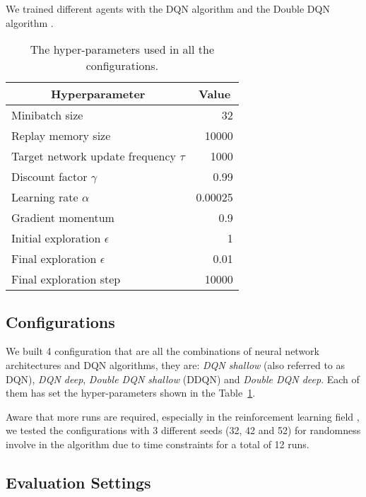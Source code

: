 We trained different agents with the DQN algorithm \cite{Mnih2015} and the Double DQN algorithm \cite{Hasselt:2016:DRL:3016100.3016191}.

\begin{table}
	\centering
	\begin{tabular}{|l|r|}
		\hline
		\multicolumn{1}{|c|}{\textbf{Hyperparameter}} &
		\multicolumn{1}{|c|}{\textbf{Value}}        \\
		\hline
		Minibatch size & 32 \\
		Replay memory size & 10000 \\
		Target network update frequency $\tau$ & 1000 \\
		Discount factor $\gamma$ & 0.99 \\
		Learning rate $\alpha$ & 0.00025 \\
		Gradient momentum & 0.9 \\
		Initial exploration $\epsilon$ & 1 \\
		Final exploration $\epsilon$ & 0.01 \\
		Final exploration step & 10000 \\
		\hline
	\end{tabular}
	
	\caption{The hyper-parameters used in all the configurations.}
	\label{tab:my-hyperparams}
\end{table}

\subsection{Configurations}

We built 4 configuration that are all the combinations of neural network architectures and DQN algorithms, they are: \textit{DQN shallow} (also referred to as DQN), \textit{DQN deep}, \textit{Double DQN shallow} (DDQN) and \textit{Double DQN deep}. Each of them has set the hyper-parameters shown in the Table~\ref{tab:my-hyperparams}.

Aware that more runs are required, especially in the reinforcement learning field \cite{DBLP:journals/corr/abs-1709-06560}, we tested the configurations with 3 different seeds (32, 42 and 52) for randomness involve in the algorithm due to time constraints for a total of 12 runs.


\subsection{Evaluation Settings}

